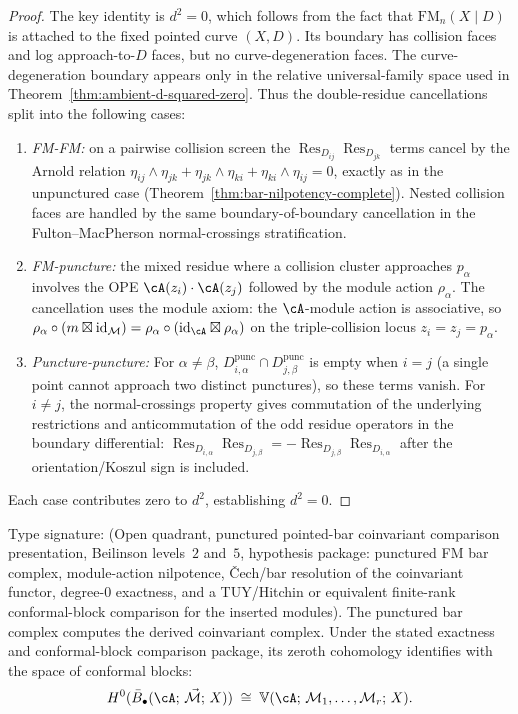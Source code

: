 \begin{proof}
The key identity is $d^2 = 0$, which follows from
the fact that $\mathrm{FM}_{n}(X \mathbin{|} D)$ is attached to the
fixed pointed curve $(X,D)$. Its boundary has collision faces and log
approach-to-$D$ faces, but no curve-degeneration faces. The
curve-degeneration boundary appears only in the relative
universal-family space used in
Theorem~\ref{thm:ambient-d-squared-zero}. Thus the double-residue
cancellations split into the following cases:
\begin{enumerate}
\item \emph{FM-FM:} on a pairwise collision screen the
 $\operatorname{Res}_{D_{ij}}\operatorname{Res}_{D_{jk}}$ terms cancel
 by the Arnold
 relation $\eta_{ij} \wedge \eta_{jk} + \eta_{jk} \wedge
 \eta_{ki} + \eta_{ki} \wedge \eta_{ij} = 0$, exactly as
 in the unpunctured case
 (Theorem~\ref{thm:bar-nilpotency-complete}). Nested collision faces
 are handled by the same boundary-of-boundary cancellation in the
 Fulton--MacPherson normal-crossings stratification.
\item \emph{FM-puncture:} the mixed residue where a collision cluster
 approaches $p_\alpha$ involves the OPE
 $\cA(z_i) \cdot \cA(z_j)$ followed by the module action
 $\rho_\alpha$. The cancellation uses the module axiom:
 the $\cA$-module action is associative, so
 $\rho_\alpha \circ (m \boxtimes \mathrm{id}_{\mathcal{M}})
 = \rho_\alpha \circ (\mathrm{id}_\cA \boxtimes \rho_\alpha)$
 on the triple-collision locus $z_i = z_j = p_\alpha$.
\item \emph{Puncture-puncture:} For $\alpha \neq \beta$,
 $D_{i,\alpha}^{\mathrm{punc}} \cap D_{j,\beta}^{\mathrm{punc}}$
 is empty when $i = j$ (a single point cannot approach two
 distinct punctures), so these terms vanish. For $i \neq j$,
 the normal-crossings property gives commutation of the underlying
 restrictions and anticommutation of the odd residue operators in the
 boundary differential:
 $\operatorname{Res}_{D_{i,\alpha}}
 \operatorname{Res}_{D_{j,\beta}}
 =-\operatorname{Res}_{D_{j,\beta}}
 \operatorname{Res}_{D_{i,\alpha}}$
 after the orientation/Koszul sign is included.
\end{enumerate}
Each case contributes zero to $d^2$, establishing
$d^2 = 0$.
\end{proof}

\begin{corollary}
\label{cor:conformal-blocks-punctured-bar}
Type signature: \textup{(}Open quadrant, punctured pointed-bar
coinvariant comparison presentation, Beilinson levels~$2$ and~$5$,
hypothesis package: punctured FM bar complex, module-action
nilpotence, Čech/bar resolution of the coinvariant functor,
degree-$0$ exactness, and a TUY/Hitchin or equivalent finite-rank
conformal-block comparison for the inserted modules\textup{)}.
The punctured bar complex computes the derived coinvariant complex.
Under the stated exactness and conformal-block comparison package, its
zeroth cohomology identifies with the space of conformal blocks:
\[
H^0(\bar{B}_\bullet(\cA;\, \vec{\mathcal{M}};\, X))
\;\cong\;
\mathbb{V}(\cA;\, \mathcal{M}_1, \ldots, \mathcal{M}_r;\, X).
\]
\end{corollary}

